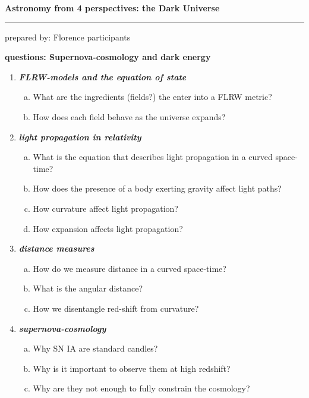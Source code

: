 \documentclass[a4paper,12pt]{article}
\newcommand{\question}[1]{\textbf{\textit{#1}}}
\newcommand{\HRule}{\rule{\linewidth}{0.3mm}}
\begin{document}
\pagestyle{empty}

\begin{center}
\LARGE \textbf{Astronomy from 4 perspectives: the Dark Universe}
\HRule
\end{center}
\begin{flushright}
prepared by: Florence participants
\end{flushright}
\begin{center}
{\Large \textbf{questions: Supernova-cosmology and dark energy}}
\end{center}
\vspace{5mm}

\begin{enumerate}

\item \question{FLRW-models and the equation of state}\\
\begin{enumerate}[(a)]
\item{What are the ingredients (fields?) the enter into a FLRW
    metric?}
\item{How does each field behave as the universe expands?}
\end{enumerate}

\item \question{light propagation in relativity}\\
\begin{enumerate}[(a)]
\item{What is the equation that describes light propagation in a
    curved space-time?}
\item{How does the presence of a body exerting gravity affect light
    paths?}
\item{How curvature affect light propagation?}
\item{How expansion affects light propagation?}
\end{enumerate}

\item \question{distance measures}\\
\begin{enumerate}[(a)]
\item{How do we measure distance in a curved space-time?}
\item{What is the angular distance?}
\item{How we disentangle red-shift from curvature?}
\end{enumerate}

\item \question{supernova-cosmology}\\
\begin{enumerate}[(a)]
\item{Why SN IA are standard candles?}
\item{Why is it important to observe them at high redshift?}
\item{Why are they not enough to fully constrain the cosmology?}
\end{enumerate}


\end{enumerate}
\end{document}
